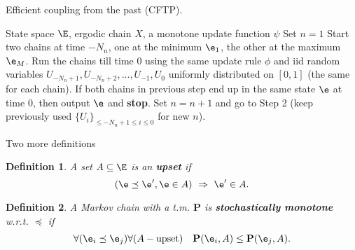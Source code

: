 \documentclass[a4paper,12pt]{article}
\newtheorem{deff}{Definition}
\begin{document}
\medskip\par 
\begin{algorithm}[H]
\caption{Efficient coupling from the past (CFTP).} \label{alg:cftp_eff}
\begin{algorithmic}[1] 
\REQUIRE State space $\E$, ergodic chain $X$, a monotone update function $\psi$
\STATE Set $n=1$
\STATE Start two chains at time  $-N_n$, one at the minimum $\e_1$, 
the other at the maximum $\e_M$.
Run the chains  till time 0 using the same update 
rule $\phi$ and iid random variables $U_{-N_n+1}, U_{-N_n+2},\ldots, U_{-1}, U_0$ 
uniformly distributed on $[0,1]$ (the same for each chain).
\STATE If both chains in previous step end up in the same state $\e$ at time $0$, then output $\e$ and \textbf{stop}. 
\STATE Set $n=n+1$ and go to Step 2  (keep previously used $\{ U_i \}_{\leq -N_n+1\leq i \leq 0}$
for new $n$).
\end{algorithmic}
\end{algorithm}

\newpage 
Two more definitions
\begin{deff}
A set $A\subseteq \E$ is an \textbf{upset} if 
 $$(\e \preceq \e', \e\in A) \ \Rightarrow \ \e'\in A.$$
\end{deff}

\begin{deff}
A Markov chain with a t.m. $\mathbf{P}$ is \textbf{stochastically monotone} w.r.t. $\preceq$ if
 $$\forall (\e_i\preceq \e_j) \forall (A - \textrm{upset})\quad \mathbf{P}(\e_i,A)\leq \mathbf{P}(\e_j,A).$$
\end{deff}
\end{document}
